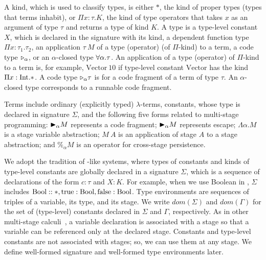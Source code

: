 


A kind, which is used to classify types, is either $*$, the kind of
proper types (types that terms inhabit), or $\Pi x\colon\tau.K$, the kind
of type operators that takes $x$ as an argument of type $\tau$ and returns a type
of kind $K$.
A type is a type-level constant $X$, which is declared in the signature with its kind, a dependent function type $\Pi x:\tau_1.\tau_2$,
an application $\tau\ M$ of a type (operator) (of $\Pi$-kind) to a term, a code type ${\mathop{\triangleright}}_\alpha$, or an $\alpha$-closed type $\forall\alpha.\tau$.
An application of a type (operator) of $\Pi$-kind to a term is, for example, $\text{Vector}\ 10$
if type-level constant $\text{Vector}$ has the kind $\Pi x:\textrm{Int}.*$.
A code type ${\mathop{\triangleright}}_\alpha \tau$ is for a code fragment of a term of type $\tau$.
An $\alpha$-closed type corresponds to a runnable code fragment.



Terms include ordinary (explicitly typed) \(\lambda\)-terms, constants,
whose type is declared in signature $\Sigma$, and the following five forms
related to multi-stage programming:
${\mathop{\blacktriangleright}}_\alpha M$ represents a code fragment; ${\mathop{\blacktriangleright}}_\alpha M$ represents escape;
$\Lambda\alpha.M$ is a stage variable abstraction;
$M\ A$ is an application of stage $A$ to a stage abstraction; and
$\%_\alpha M$ is an operator for cross-stage persistence.


We adopt the tradition of \LLF-like systems, where types of constants and kinds of type-level constants are globally declared in a signature $\Sigma$, which
is a sequence of declarations of the form $c:\tau$ and $X:K$.
For example, when we use Boolean in \LMD, $\Sigma$ includes $\textrm{Bool} :: *, \textrm{true}:\textrm{Bool}, \textrm{false}:\textrm{Bool}$.
Type environments are sequences of triples of a variable, its type, and its stage.
We write \(\textit{dom}(\Sigma)\) and \(\textit{dom}(\Gamma)\)
for the set of (type-level) constants declared in \(\Sigma\) and \(\Gamma\), respectively.   As in other multi-stage calculi~\cite{taha2003environment,Tsukada,Hanada2014},
a variable declaration is associated with a stage
so that a variable can be referenced only at the declared stage.
Constants and type-level constants are not associated with stages;
so, we can use them at any stage.
We define well-formed signature and well-formed type environments later.

